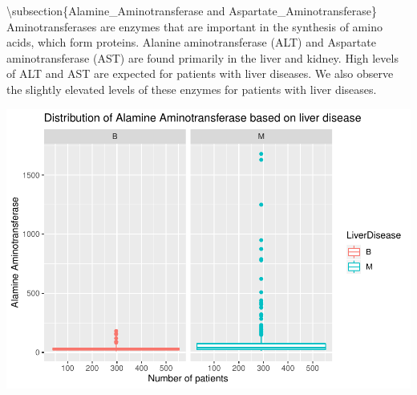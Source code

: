 \documentclass[]{article}
\newenvironment{Shaded}{\begin{snugshade}}{\end{snugshade}}
\newcommand{\CommentTok}[1]{\textcolor[rgb]{0.56,0.35,0.01}{\textit{#1}}}
\newcommand{\DataTypeTok}[1]{\textcolor[rgb]{0.13,0.29,0.53}{#1}}
\newcommand{\KeywordTok}[1]{\textcolor[rgb]{0.13,0.29,0.53}{\textbf{#1}}}
\newcommand{\NormalTok}[1]{#1}
\newcommand{\OperatorTok}[1]{\textcolor[rgb]{0.81,0.36,0.00}{\textbf{#1}}}
\newcommand{\StringTok}[1]{\textcolor[rgb]{0.31,0.60,0.02}{#1}}
\begin{document}
\textbackslash subsection\{Alamine\_Aminotransferase and
Aspartate\_Aminotransferase\} Aminotransferases are enzymes that are
important in the synthesis of amino acids, which form proteins. Alanine
aminotransferase (ALT) and Aspartate aminotransferase (AST) are found
primarily in the liver and kidney. High levels of ALT and AST are
expected for patients with liver diseases. We also observe the slightly
elevated levels of these enzymes for patients with liver diseases.

\begin{Shaded}
\end{Shaded}

\includegraphics{LiverDisease_files/figure-latex/unnamed-chunk-16-1.pdf}
\end{document}
